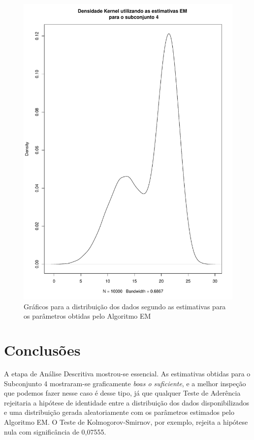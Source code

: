\documentclass[
	article,			%
	11pt,				%
	oneside,			%
	a4paper,			%
	english,			%
	brazil,				%
	sumario=tradicional
	]{abntex2}
\begin{document}
\begin{figure}[H]
\centering
\includegraphics[scale = 0.6]{sub4}
\caption{Gráficos para a distribuição dos dados segundo as estimativas para os parâmetros obtidas pelo Algoritmo EM}
\label{fig:sub4}
\end{figure}

\section{Conclusões}
\label{sec:conclusoes}
A etapa de Análise Descritiva mostrou-se essencial. As estimativas obtidas para o Subconjunto 4 mostraram-se graficamente \textit{boas o suficiente}, e a melhor inspeção que podemos fazer nesse caso é desse tipo, já que qualquer Teste de Aderência rejeitaria a hipótese de identidade entre a distribuição dos dados disponibilizados e uma distribuição gerada aleatoriamente com os parâmetros estimados pelo Algoritmo EM. O Teste de Kolmogorov-Smirnov, por exemplo, rejeita a hipótese nula com significância de 0,07555. 
% 
\end{document}
